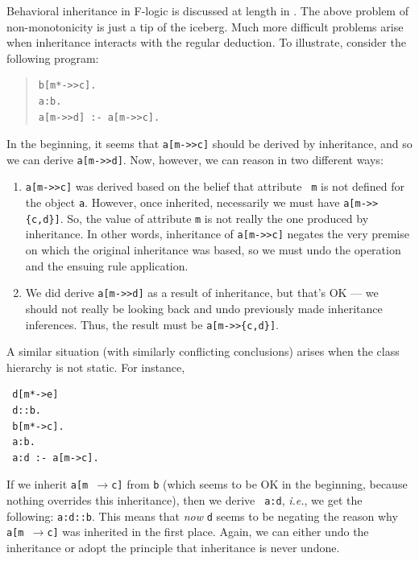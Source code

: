 \documentclass[11pt]{article}
\newcommand{\fd}{\ensuremath{{\rightarrow}}}                   %
\newcommand{\fl}{\mbox{F-logic}\xspace}
\begin{document}
Behavioral inheritance in \fl is discussed at length in \cite{KLW95}.
The above problem of non-monotonicity is just a tip of the iceberg. Much
more difficult problems arise when inheritance interacts with the regular
deduction. To illustrate, consider the following program:
\begin{quote}
\begin{verbatim}
b[m*->>c].
a:b.
a[m->>d] :- a[m->>c].
\end{verbatim}
\end{quote}
In the beginning, it seems that \verb|a[m->>c]| should be derived by
inheritance, and so we can derive \verb|a[m->>d]|. Now, however, we can
reason in two different ways:
\begin{enumerate}
\item \verb|a[m->>c]| was derived based on the belief that attribute {\tt
    m} is not defined for the object {\tt a}. However, once inherited,
  necessarily we must have \verb|a[m->>{c,d}]|. So, the value of
  attribute {\tt m} is not really the one produced by inheritance. In other
  words, inheritance of \verb|a[m->>c]| negates the very premise on which
  the original inheritance was based, so we must undo the operation and the
  ensuing rule application.
\item We did derive \verb|a[m->>d]| as a result of inheritance, but
  that's OK --- we should not really be looking back and undo previously
  made inheritance inferences. Thus, the result must be \verb|a[m->>{c,d}]|.
\end{enumerate}
A similar situation (with similarly conflicting conclusions) arises when
the class hierarchy is not static. For instance, 
\begin{verbatim}
 d[m*->e]
 d::b.
 b[m*->c].
 a:b.
 a:d :- a[m->c].  
\end{verbatim}
If we inherit {\tt a[m \fd c]}  from {\tt b} (which seems to be OK in the
beginning, because nothing overrides this inheritance), then we derive {\tt
  a:d}, {\it i.e.}, we get the following: {\tt a:d::b}. This means that
\emph{now} {\tt d} seems to be negating the reason why {\tt a[m \fd c]} was
inherited in the first place. Again, we can either undo the inheritance or
adopt the principle that inheritance is never undone.
\end{document}
